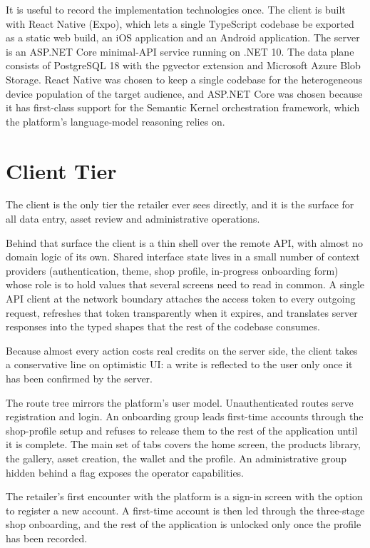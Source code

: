 It is useful to record the implementation technologies once. The client is built with React Native \cite{reactnative} (Expo), which lets a single TypeScript codebase be exported as a static web build, an iOS application and an Android application. The server is an ASP.NET Core minimal-API service running on .NET 10. The data plane consists of PostgreSQL 18 with the pgvector extension and Microsoft Azure Blob Storage. React Native was chosen to keep a single codebase for the heterogeneous device population of the target audience, and ASP.NET Core was chosen because it has first-class support for the Semantic Kernel orchestration framework, which the platform's language-model reasoning relies on.

\section{Client Tier}
\label{sec:client-tier}

The client is the only tier the retailer ever sees directly, and it is the surface for all data entry, asset review and administrative operations.

Behind that surface the client is a thin shell over the remote API, with almost no domain logic of its own. Shared interface state lives in a small number of context providers (authentication, theme, shop profile, in-progress onboarding form) whose role is to hold values that several screens need to read in common. A single API client at the network boundary attaches the access token to every outgoing request, refreshes that token transparently when it expires, and translates server responses into the typed shapes that the rest of the codebase consumes.

Because almost every action costs real credits on the server side, the client takes a conservative line on optimistic UI: a write is reflected to the user only once it has been confirmed by the server.

The route tree mirrors the platform's user model. Unauthenticated routes serve registration and login. An onboarding group leads first-time accounts through the shop-profile setup and refuses to release them to the rest of the application until it is complete. The main set of tabs covers the home screen, the products library, the gallery, asset creation, the wallet and the profile. An administrative group hidden behind a flag exposes the operator capabilities.

\label{subsec:client-ui}
The retailer's first encounter with the platform is a sign-in screen with the option to register a new account. A first-time account is then led through the three-stage shop onboarding, and the rest of the application is unlocked only once the profile has been recorded.

